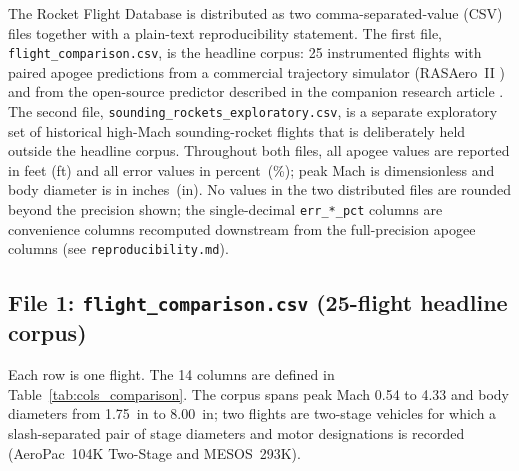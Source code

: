 
The Rocket Flight Database is distributed as two comma-separated-value (CSV)
files together with a plain-text reproducibility statement. The first file,
\texttt{flight\_comparison.csv}, is the headline corpus: 25 instrumented
flights with paired apogee predictions from a commercial trajectory simulator
(RASAero~II \cite{rogers2015,rogers_rasaero_alt}) and from the open-source
predictor described in the companion research article \cite{yu2026jsr}. The
second file, \texttt{sounding\_rockets\_exploratory.csv}, is a separate
exploratory set of historical high-Mach sounding-rocket flights that is
deliberately held outside the headline corpus. Throughout both files, all
apogee values are reported in feet (ft) and all error values in percent~(\%);
peak Mach is dimensionless and body diameter is in inches~(in). No values in
the two distributed files are rounded beyond the precision shown; the
single-decimal \texttt{err\_*\_pct} columns are convenience columns recomputed
downstream from the full-precision apogee columns
(see \texttt{reproducibility.md}).

\subsection{File 1: \texttt{flight\_comparison.csv} (25-flight headline corpus)}

Each row is one flight. The 14 columns are defined in
Table~\ref{tab:cols_comparison}. The corpus spans peak Mach 0.54 to 4.33 and
body diameters from 1.75~in to 8.00~in; two flights are two-stage vehicles for
which a slash-separated pair of stage diameters and motor designations is
recorded (AeroPac~104K Two-Stage and MESOS~293K).

